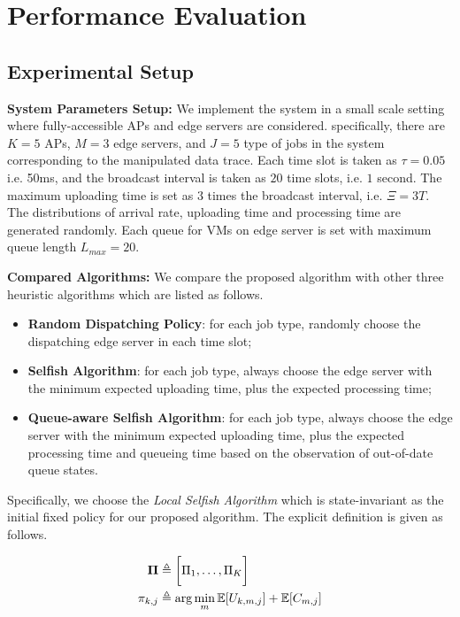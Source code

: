 \section{Performance Evaluation}
\label{sec:evaluation}

\subsection{Experimental Setup}
\textbf{System Parameters Setup:}
We implement the system in a small scale setting where fully-accessible APs and edge servers are considered.
specifically, there are $K=5$ APs, $M=3$ edge servers, and $J=5$ type of jobs in the system corresponding to the manipulated data trace.
Each time slot is taken as $\tau = 0.05$ i.e. 50ms, and the broadcast interval is taken as $20$ time slots, i.e. $1$ second.
The maximum uploading time is set as $3$ times the broadcast interval, i.e. $\Xi = 3T$.
The distributions of arrival rate, uploading time and processing time are generated randomly.
Each queue for VMs on edge server is set with maximum queue length $L_{max}=20$.

\textbf{Compared Algorithms:}
We compare the proposed algorithm with other three heuristic algorithms which are listed as follows.
\begin{itemize}
    \item \textbf{Random Dispatching Policy}:
            for each job type, randomly choose the dispatching edge server in each time slot; 
    \item \textbf{Selfish Algorithm}:
            for each job type, always choose the edge server with the minimum expected uploading time, plus the expected processing time;
    \item \textbf{Queue-aware Selfish Algorithm}:
            for each job type, always choose the edge server with the minimum expected uploading time, plus the expected processing time and queueing time based on the observation of out-of-date queue states.
\end{itemize}
Specifically, we choose the \emph{Local Selfish Algorithm} which is state-invariant as the initial fixed policy for our proposed algorithm.
The explicit definition is given as follows.
\begin{policy}
    \begin{align}
        \boldsymbol{\Pi} &\triangleq \bigg[ \Pi_{1}, \dots, \Pi_{K} \bigg]
        \\
        \pi_{k,j} &\triangleq \arg\min_{m} \mathbb{E}[U_{k,m,j}] + \mathbb{E}[C_{m,j}]
    \end{align} 
\end{policy}

